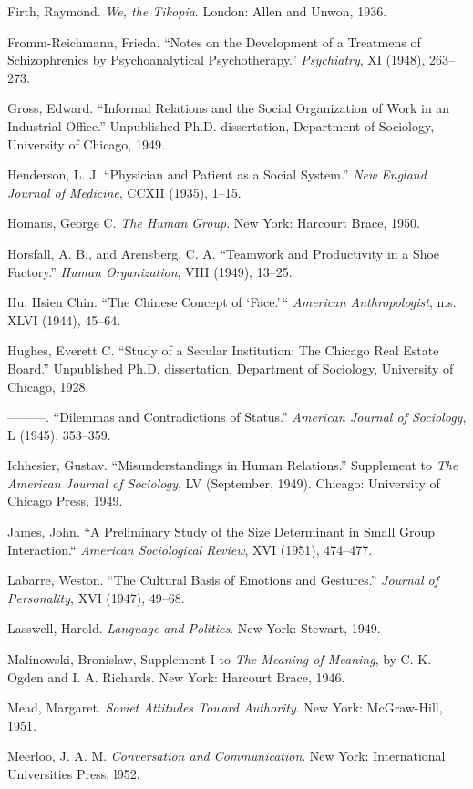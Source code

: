 \documentclass[twoside,symmetric,nobib,justified]{tufte-book}
\begin{document}
\begin{hangparas}{.25in}{1}
Firth, Raymond. \emph{We, the Tikopia}. London: Allen and Unwon, 1936.

Fromm-Reichmann, Frieda. ``Notes on the Development of a Treatmens of
Schizophrenics by Psychoanalytical Psychotherapy.'' \emph{Psychiatry},
XI (1948), 263--273.

Gross, Edward. ``Informal Relations and the Social Organization of Work
in an Industrial Office.'' Unpublished Ph.D. dissertation, Department of
Sociology, University of Chicago, 1949.

Henderson, L. J. ``Physician and Patient as a Social System.'' \emph{New
England Journal of Medicine}, CCXII (1935), 1--15.

Homans, George C. \emph{The Human Group}. New York: Harcourt Brace,
1950.

Horsfall, A. B., and Arensberg, C. A. ``Teamwork and Productivity in a
Shoe Factory.'' \emph{Human Organization}, VIII (1949), 13--25.

Hu, Hsien Chin. ``The Chinese Concept of `Face.'\,`` \emph{American
Anthropologist}, n.s. XLVI (1944), 45--64.

Hughes, Everett C. ``Study of a Secular Institution: The Chicago Real
Estate Board.'' Unpublished Ph.D. dissertation, Department of Sociology,
University of Chicago, 1928.

---------. ``Dilemmas and Contradictions of Status.'' \emph{American
Journal of Sociology}, L (1945), 353--359.

Ichhesier, Gustav. ``Misunderstandings in Human Relations.'' Supplement
to \emph{The American Journal of Sociology}, LV (September, 1949).
Chicago: University of Chicago Press, 1949.

James, John. ``A Preliminary Study of the Size Determinant in Small
Group Interaction.`` \emph{American Sociological Review}, XVI (1951),
474--477.

Labarre, Weston. ``The Cultural Basis of Emotions and Gestures.''
\emph{Journal of Personality}, XVI (1947), 49--68.

Lasswell, Harold. \emph{Language and Politics}. New York: Stewart, 1949.

Malinowski, Bronislaw, Supplement I to \emph{The Meaning of Meaning}, by
C. K. Ogden and I. A. Richards. New York: Harcourt Brace, 1946.

Mead, Margaret. \emph{Soviet Attitudes Toward Authority}. New York:
McGraw-Hill, 1951.

Meerloo, J. A. M. \emph{Conversation and Communication}. New York:
International Universities Press, l952.


\end{hangparas}
\end{document}

